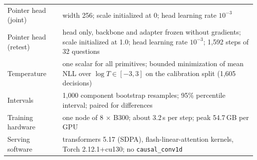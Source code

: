 \begin{table}[h]
\begin{tabular}{@{}lp{9.6cm}@{}}
Pointer head (joint) & width 256; scale initialized at 0; head learning rate $10^{-3}$ \\
Pointer head (retest) & head only, backbone and adapter frozen without gradients; scale
  initialized at 1.0; head learning rate $10^{-3}$; 1,592 steps of 32 questions \\
Temperature & one scalar for all primitives; bounded minimization of mean NLL over
  $\log T\in[-3,3]$ on the calibration split (1,605 decisions) \\
Intervals & 1,000 component bootstrap resamples; 95\% percentile interval; paired for
  differences \\
Training hardware & one node of 8 $\times$ B300; about
  3.2\,s per step; peak 54.7\,GB per GPU \\
Serving software & transformers 5.17 (SDPA), flash-linear-attention kernels, Torch
  2.12.1+cu130; no \texttt{causal\_conv1d} \\
\bottomrule
\end{tabular}
\end{table}
